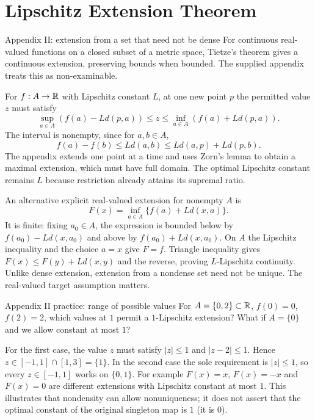 \clearpage
\section{Lipschitz Extension Theorem}
\begin{note}{Appendix II: extension from a set that need not be dense}
For continuous real-valued functions on a closed subset of a metric space, Tietze's theorem gives a continuous extension, preserving bounds when bounded. The supplied appendix treats this as non-examinable.

For $f:A\to\mathbb R$ with Lipschitz constant $L$, at one new point $p$ the permitted value $z$ must satisfy
\[\sup_{a\in A}(f(a)-Ld(p,a))\le z\le\inf_{a\in A}(f(a)+Ld(p,a)).\]
The interval is nonempty, since for $a,b\in A$,
\[f(a)-f(b)\le Ld(a,b)\le Ld(a,p)+Ld(p,b).\]
The appendix extends one point at a time and uses Zorn's lemma to obtain a maximal extension, which must have full domain. The optimal Lipschitz constant remains $L$ because restriction already attains its supremal ratio.

An alternative explicit real-valued extension for nonempty $A$ is
\[F(x)=\inf_{a\in A}\{f(a)+Ld(x,a)\}.\]
It is finite: fixing $a_0\in A$, the expression is bounded below by $f(a_0)-Ld(x,a_0)$ and above by $f(a_0)+Ld(x,a_0)$. On $A$ the Lipschitz inequality and the choice $a=x$ give $F=f$. Triangle inequality gives $F(x)\le F(y)+Ld(x,y)$ and the reverse, proving $L$-Lipschitz continuity. Unlike dense extension, extension from a nondense set need not be unique. The real-valued target assumption matters.
\end{note}
\begin{exam}{Appendix II practice: range of possible values}
For $A=\{0,2\}\subset\mathbb R$, $f(0)=0$, $f(2)=2$, which values at $1$ permit a $1$-Lipschitz extension? What if $A=\{0\}$ and we allow constant at most $1$?
\end{exam}
\begin{answer}
For the first case, the value $z$ must satisfy $|z|\le1$ and $|z-2|\le1$. Hence $z\in[-1,1]\cap[1,3]=\{1\}$. In the second case the sole requirement is $|z|\le1$, so every $z\in[-1,1]$ works on $\{0,1\}$. For example $F(x)=x$, $F(x)=-x$ and $F(x)=0$ are different extensions with Lipschitz constant at most $1$. This illustrates that nondensity can allow nonuniqueness; it does not assert that the optimal constant of the original singleton map is $1$ (it is $0$).
\end{answer}